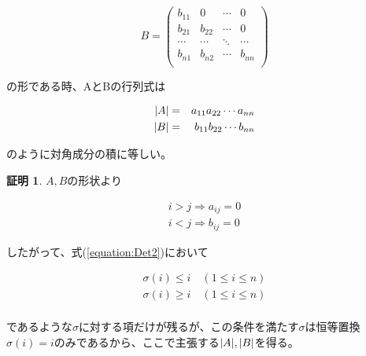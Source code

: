 \documentclass[dvipdfmx,autodetect-engine]{jsarticle}
\theoremstyle{definition}
\newtheorem*{Proof*}{証明}
\DeclarePairedDelimiter{\abs}{\lvert}{\rvert}
\begin{document}
$$
B = \begin{pmatrix}
b_{11} & 0 & \cdots & 0 \\
b_{21} & b_{22} & \cdots & 0 \\
\cdots & \cdots & \ddots & \cdots \\
b_{n1} & b_{n2} & \cdots & b_{nn} \\
\end{pmatrix}
$$

の形である時、AとBの行列式は

\begin{eqnarray*}
\abs{A} &= &a_{11}a_{22} \cdots a_{nn} \\
\abs{B} &= &b_{11}b_{22} \cdots b_{nn}
\end{eqnarray*}

のように対角成分の積に等しい。

\begin{Proof*}
$A, B$の形状より

\begin{eqnarray*}
i > j \Longrightarrow a_{ij} = 0 \\
i < j \Longrightarrow b_{ij} = 0
\end{eqnarray*}

したがって、式(\ref{equation:Det2})において

\begin{eqnarray*}
\sigma(i) \leq i \quad (1 \leq i \leq n) \\
\sigma(i) \geq i \quad (1 \leq i \leq n) \\
\end{eqnarray*}

であるような$\sigma$に対する項だけが残るが、この条件を満たす$\sigma$は恒等置換$\sigma(i) = i$のみであるから、ここで主張する$\abs{A}, \abs{B}$を得る。
\end{Proof*}
\end{document}
